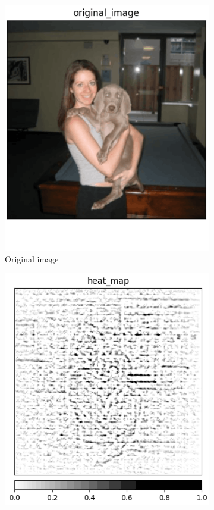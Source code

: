 \begin{figure}[h]
  \centering
 \begin{subfigure}{.2\textwidth}
    \centering
    \includegraphics[width=\textwidth]{methods/images/Weimaraner-image.png}
    \caption{Original image}\label{fig:gbp-weimaraner}
\end{subfigure}
 \begin{subfigure}{.25\textwidth}
    \centering
    \includegraphics[width=\textwidth]{methods/images/1-4-0-rotation-30-Weimaraner-Weimaraner.png}

\end{subfigure}
\end{figure}
